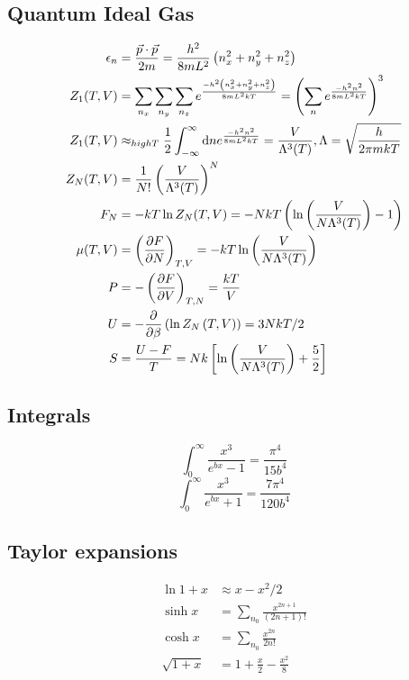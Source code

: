 \documentclass[a4paper, norsk, 8pt]{article}
\begin{document}
\begin{multicols*}{3}
\subsection*{\footnotesize Quantum Ideal Gas}
\begin{align*}
  \epsilon_n &= \frac{\vec{p}\cdot\vec{p}}{2m}  = \frac{h^2}{8mL^2}\left(n_x^2+n_y^2+n_z^2\right) \\
  Z_1(T,V) &= \sum_{n_x}\sum_{n_y}\sum_{n_z}e^{\frac{-h^2\left(n_x^2+n_y^2+n_z^2\right)}{8mL^2kT}} = \left( \sum_{n}e^{\frac{-h^2n^2}{8mL^2kT}} \right)^3 \\
  Z_1(T,V) &\approx_{high T} \frac{1}{2}\int_{-\infty}^{\infty}\mbox{d}n e^{\frac{-h^2n^2}{8mL^2kT}} = \frac{V}{\Lambda^3(T)}, \Lambda = \sqrt{\frac{h}{2\pi mkT}}\\
  Z_N(T,V) &= \frac{1}{N!}\left(\frac{V}{\Lambda^3(T)}\right)^N \\
  F_N &= -kT\ln{Z_N(T,V)} = -NkT\left( \ln{\left( \frac{V}{N\Lambda^3(T)}\right)} -1 \right)\\
  \mu(T,V) &= \left( \pdv{F}{N} \right)_{T,V} = -kT\ln{\left( \frac{V}{N\Lambda^3(T)} \right)} \\
  P &= -\left( \pdv{F}{V} \right)_{T,N} = \frac{kT}{V}\\
  U &= -\pdv{}{\beta}\left( \ln{Z_N\left(T, V\right)}\right) = 3NkT/2 \\
  S &= \frac{U-F}{T} = Nk\left[ \ln{\left( \frac{V}{N\Lambda^3(T)} \right)} + \frac{5}{2} \right]
\end{align*}

\subsection*{\footnotesize  Integrals}
$$ \int_0^{\infty} \frac{x^3}{e^{bx}-1} = \frac{\pi^4}{15b^4}$$
$$ \int_0^{\infty} \frac{x^3}{e^{bx}+1} = \frac{7\pi^4}{120b^4}$$

\subsection*{\footnotesize  Taylor expansions}
\begin{align*}
  \ln{1+x} &\approx x - x^2/2 \\
  \sinh{x} &= \sum_{n_0} \frac{x^{2n+1}}{(2n+1)!} \\
  \cosh{x} &= \sum_{n_0} \frac{x^{2n}}{2n!}\\
  \sqrt{1+x} &= 1 + \frac{x}{2} - \frac{x^2}{8}\\
\end{align*}



\end{multicols*}
\end{document}
